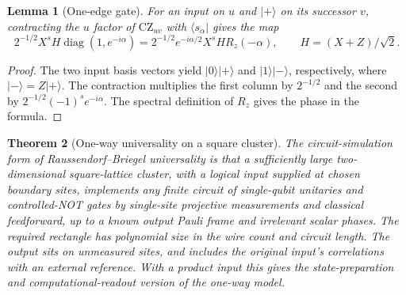 \documentclass[aps,pra,onecolumn,superscriptaddress,nofootinbib,10pt]{revtex4-2}
\newtheorem{theorem}{Theorem}
\newtheorem{lemma}[theorem]{Lemma}
\theoremstyle{definition}
\theoremstyle{remark}
\begin{document}
\begin{lemma}[One-edge gate]\label{cp:edge}
For an input on $u$ and $|+\rangle$ on its successor $v$, contracting the $u$ factor of $\mathrm{CZ}_{uv}$ with $\langle s_\alpha|$ gives the map
\[
 2^{-1/2}X^s H\operatorname{diag}(1,e^{-i\alpha})
 =2^{-1/2}e^{-i\alpha/2}X^s H R_z(-\alpha),
 \qquad H=(X+Z)/\sqrt2 .
\]
\end{lemma}
\begin{proof}
The two input basis vectors yield $|0\rangle|+\rangle$ and $|1\rangle|-\rangle$, respectively, where $|-\rangle=Z|+\rangle$. The contraction multiplies the first column by $2^{-1/2}$ and the second by $2^{-1/2}(-1)^s e^{-i\alpha}$. The spectral definition of $R_z$ gives the phase in the formula.
\end{proof}

\begin{theorem}[One-way universality on a square cluster]\label{cp:universal}
The circuit-simulation form of Raussendorf--Briegel universality is that a sufficiently large two-dimensional square-lattice cluster, with a logical input supplied at chosen boundary sites, implements any finite circuit of single-qubit unitaries and controlled-NOT gates by single-site projective measurements and classical feedforward, up to a known output Pauli frame and irrelevant scalar phases. The required rectangle has polynomial size in the wire count and circuit length. The output sits on unmeasured sites, and includes the original input's correlations with an external reference. With a product input this gives the state-preparation and computational-readout version of the one-way model. \cite{n5-rb,n5-rbb}
\end{theorem}
\end{document}
